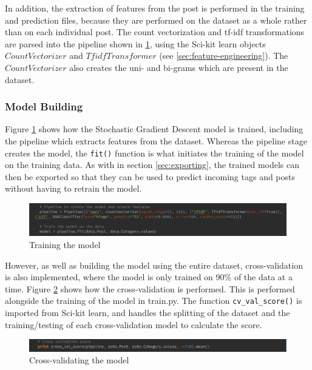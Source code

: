 In addition, the extraction of features from the post is performed in the training and prediction files, because they are performed on the dataset as a whole rather than on each individual post. The count vectorization and tf-idf transformations are parsed into the pipeline shown in \ref{fig:imp-content-train}, using the Sci-kit learn objects $CountVectorizer$ and $TfidfTransformer$ (see \ref{sec:feature-engineering}). The $CountVectorizer$ also creates the uni- and bi-grams which are present in the dataset.

\subsubsection{Model Building}
Figure \ref{fig:imp-content-train} shows how the Stochastic Gradient Descent model is trained, including the pipeline which extracts features from the dataset. Whereas the pipeline stage creates the model, the \texttt{fit()} function is what initiates the training of the model on the training data. As with in section \ref{sec:exporting}, the trained models can then be exported so that they can be used to predict incoming tags and posts without having to retrain the model.

\begin{figure}[H]
\centering
\includegraphics[width=\textwidth]{Images/Implementation/content-train}
\caption{Training the model}
\label{fig:imp-content-train}
\end{figure}

However, as well as building the model using the entire dataset, cross-validation is also implemented, where the model is only trained on 90\% of the data at a time. Figure \ref{fig:content-cv} shows how the cross-validation is performed. This is performed alongside the training of the model in train.py. The function \texttt{cv\_val\_score()} is imported from Sci-kit learn, and handles the splitting of the dataset and the training/testing of each cross-validation model to calculate the score.

\begin{figure}[H]
\centering
\includegraphics[width=\textwidth]{Images/Implementation/content-cv}
\caption{Cross-validating the model}
\label{fig:content-cv}
\end{figure}

